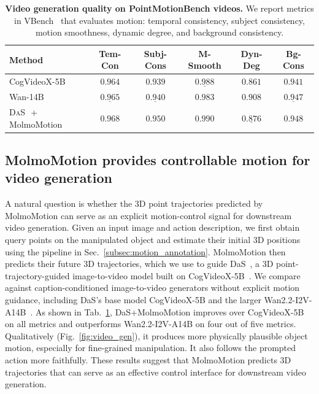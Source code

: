 \documentclass{llmxive}
\providecommand{\modelname}{MolmoMotion\xspace}
\providecommand{\benchmarkname}{PointMotionBench\xspace}
\begin{document}
\begin{table}[t]
  \centering
  \small
  \setlength{\tabcolsep}{6pt}
  \begin{tabular}{lccccc}
    Method & Tem-Con & Subj-Cons & M-Smooth & Dyn-Deg & Bg-Cons \\
    \midrule
    CogVideoX-5B~\cite{yang2025cogvideoxtexttovideodiffusionmodels}                 & $0.964$ & $0.939$ & $\underline{0.988}$ & $0.861$ & $0.941$ \\
    Wan-14B~\cite{wan22}                      & $\underline{0.965}$ & $\underline{0.940}$ & $0.983$ & $\mathbf{0.908}$ & $\underline{0.947}$ \\
    \textsc{DaS~\cite{gu2025diffusionasshader}}\,+\,MolmoMotion & $\mathbf{0.968}$ & $\mathbf{0.950}$ & $\mathbf{0.990}$ & $\underline{0.876}$ & $\mathbf{0.948}$ \\
  \end{tabular}
  \vspace{1mm}
\caption{\textbf{Video generation quality on \benchmarkname{} videos.} We report metrics in VBench~\cite{huang2023vbench} that evaluates motion: temporal consistency, subject consistency, motion smoothness, dynamic degree, and background consistency.
  }
  \label{tab:vid_gen_comparison}
\end{table}

\subsection{\modelname provides controllable motion for video generation}
\label{subsec:video_gen}



A natural question is whether the 3D point trajectories predicted by \modelname can serve as an explicit motion-control signal for downstream video generation. Given an input image and action description, we first obtain query points on the manipulated object and estimate their initial 3D positions using the pipeline in Sec.~\ref{subsec:motion_annotation}. \modelname then predicts their future 3D trajectories, which we use to guide DaS~\cite{gu2025diffusionasshader}, a 3D point-trajectory-guided image-to-video model built on CogVideoX-5B~\cite{yang2025cogvideoxtexttovideodiffusionmodels}. We compare against caption-conditioned image-to-video generators without explicit motion guidance, including DaS's base model CogVideoX-5B and the larger Wan2.2-I2V-A14B~\cite{wan22}. As shown in Tab.~\ref{tab:vid_gen_comparison}, DaS+\modelname improves over CogVideoX-5B on all metrics and outperforms Wan2.2-I2V-A14B on four out of five metrics. Qualitatively (Fig.~\ref{fig:video_gen}), it produces more physically plausible object motion, especially for fine-grained manipulation. It also follows the prompted action more faithfully. These results suggest that \modelname predicts 3D trajectories that can serve as an effective control interface for downstream video generation.
\end{document}
